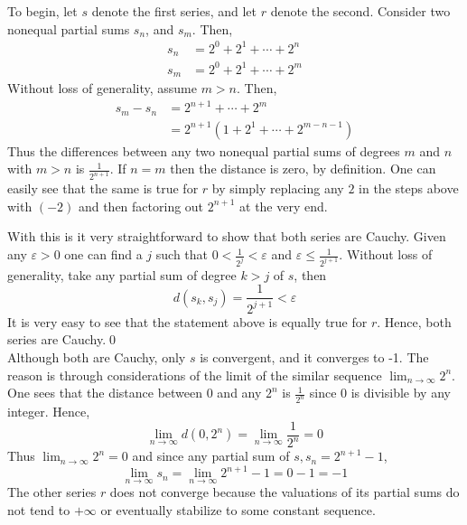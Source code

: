 \documentclass[12pt, letterpaper]{article}
\begin{document}
\noindent To begin, let $s$ denote the first series, and let $r$ denote the second. Consider two nonequal partial sums $s_n$, and $s_m$. Then,
\begin{align*}
  s_n &= 2^0 + 2^1 + \cdots + 2^n \\
  s_m &= 2^0 + 2^1 + \cdots + 2^m
\end{align*}
Without loss of generality, assume $m > n$. Then,
\begin{align*}
  s_m - s_n &= 2^{n + 1} + \cdots + 2^m \\
  &= 2^{n + 1}(1 + 2^1 + \cdots + 2^{m - n - 1})
\end{align*}
Thus the differences between any two nonequal partial sums of degrees $m$ and $n$ with $m > n$ is $\frac{1}{2^{n+1}}$. If $n = m$ then the distance is zero, by definition.
One can easily see that the same is true for $r$ by simply replacing any $2$ in the steps above with $(-2)$ and then factoring out $2^{n+1}$ at the very end.
\par With this is it very straightforward to show that both series are
Cauchy. Given any $\varepsilon > 0$ one can find a $j$ such that $0 < \frac{1}{2^j} < \varepsilon$ and $\varepsilon \leq \frac{1}{2^{j + 1}}$.
Without loss of generality, take any partial sum of degree $k > j$ of $s$, then
$$d(s_k, s_j) = \frac{1}{2^{j + 1}} < \varepsilon$$
It is very easy to see that the statement above is equally true for $r$. Hence, both series are Cauchy.\qed\\

\noindent Although both are Cauchy, only $s$ is convergent, and it converges to -1. The reason is through considerations of the limit of the similar sequence $\lim_{n\to\infty} 2^n$.
One sees that the distance between 0 and any $2^n$ is $\frac{1}{2^n}$ since 0 is divisible by any integer. Hence,
$$ \lim_{n\to\infty} d(0, 2^n) = \lim_{n\to\infty} \frac{1}{2^n} = 0$$
Thus $\lim_{n\to\infty} 2^n = 0$ and since any partial sum of $s, s_n = 2^{n+1} - 1$,
$$\lim_{n\to\infty} s_n = \lim_{n\to\infty} 2^{n + 1} - 1 = 0 - 1 = -1$$
The other series $r$ does not converge because the valuations of its partial sums do not tend to $+\infty$ or eventually stabilize to some constant sequence.
\end{document}
